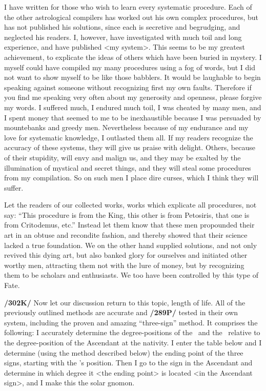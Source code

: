 I have written for those who wish to learn every systematic procedure. Each of the other astrological compilers has worked out his own complex procedures, but has not published his solutions, since each is
secretive and begrudging, and neglected his readers. I, however, have investigated with much toil and long experience, and have published <my system>. This seems to be my greatest achievement, to explicate the ideas of others which have been buried in mystery. I myself could have compiled my many procedures using a fog of words, but I did not want to show myself to be like those babblers. It would be laughable to begin speaking against someone without recognizing first my own faults. Therefore if you find me speaking very often about my generosity and openness, please forgive my words. I suffered much, I
endured much toil, I was cheated by many men, and I spent money that seemed to me to be inexhaustible because I was persuaded by mountebanks and greedy men. Nevertheless because of my endurance and my love for systematic knowledge, I outlasted them all. If my readers recognize the accuracy of these systems, they will give us praise with delight. Others, because of their stupidity, will envy and malign us, and they may be exalted by the illumination of mystical and secret things, and they will steal some procedures from my compilation. So on such men I place dire curses, which I think they will suffer.

Let the readers of our collected works, works which explicate all procedures, not say: “This procedure is from the King, this other is from Petosiris, that one is from Critodemus, etc.” Instead let them know
that these men propounded their art in an obtuse and recondite fashion, and thereby showed that their science lacked a true foundation. We on the other hand supplied solutions, and not only revived this dying art, but also banked glory for ourselves and initiated other worthy men, attracting them not with the lure of money, but by recognizing them to be scholars and enthusiasts. We too have been controlled by this type of Fate.

\textbf{/302K/} Now let our discussion return to this topic, length of life. All of the previously outlined methods are accurate and \textbf{/289P/} tested in their own system, including the proven and amazing “three-sign” method. It comprises the following: I accurately determine the degree-positions of the \Sun\, and the \Moon\, relative to the degree-position of the Ascendant at the nativity. I enter the table below and I determine (using the method described below) the ending point of the three signs, starting with the \Sun’s position. Then I go to the sign in the Ascendant and determine in which degree it <the ending point> is located <in the Ascendant sign>, and I make this the solar gnomon. 


